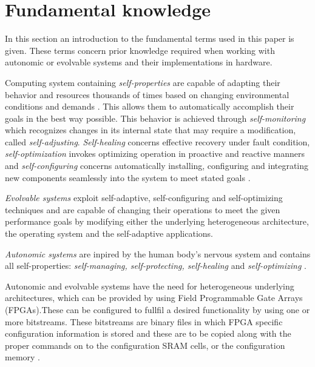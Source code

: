 \section{Fundamental knowledge}
\label{sec:fundamental}
In this section an introduction to the fundamental terms used in this paper is given. These terms concern prior knowledge required when working with autonomic or evolvable systems and their implementations in hardware. 

Computing system containing \emph{self-properties} are capable of adapting their behavior and resources thousands of times based on changing environmental conditions and demands \cite{selfaware}. This allows them to automatically accomplish their goals in the best way possible. This behavior is achieved through \emph{self-monitoring} which recognizes changes in its internal state that may require a modification, called \emph{self-adjusting}. \emph{Self-healing} concerns effective recovery under fault condition, \emph{self-optimization} invokes optimizing operation in proactive and reactive manners and \emph{self-configuring} concerns automatically installing, configuring and integrating new components seamlessly into the system to meet stated goals \cite{autocom}. 

\emph{Evolvable systems} exploit self-adaptive, self-configuring and self-optimizing techniques and are capable of changing their operations to meet the given performance goals by modifying either the underlying heterogeneous architecture, the operating system and the self-adaptive applications. \cite{evolvable}

\emph{Autonomic systems} are inpired by the human body's nervous system and contains all self-properties: \emph{self-managing, self-protecting, self-healing} and \emph{self-optimizing} \cite{autonomic}. 

Autonomic and evolvable systems have the need for heterogeneous underlying architectures, which can be provided by using Field Programmable Gate Arrays (FPGAs).These can be configured to fullfil a desired functionality by using one or more bitstreams. These bitstreams are binary files in which FPGA specific configuration information is stored and these are to be copied along with the proper commands on to the configuration SRAM cells, or the configuration memory \cite{reconfigurable}. 
